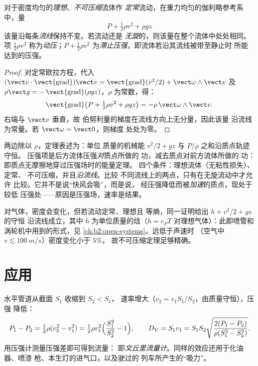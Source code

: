 \begin{theorem}[伯努利]\label{thm:b2:euler-bernoulli:bernoulli}
对于密度均匀的\emph{理想}、\emph{不可压缩}流体作
\emph{定常}流动，在重力均匀的伽利略参考系中，量
\[
P + \tfrac12\rho v^2 + \rho gz
\]
该量沿每条\emph{流线}保持不变。若流动还是
\emph{无旋}的，则该量在整个流体中处处相同。
项 $\tfrac12\rho v^2$ 称为\emph{动压}；$P + \tfrac12\rho v^2$
为\emph{滞止压强}，即流体若沿其流线被带至静止时
所能达到的压强。
\end{theorem}

\begin{proof}
对定常欧拉方程，代入 $(\vect v\cdot\operatorname{\vect{grad}})\vect v =
\operatorname{\vect{grad}}(v^2/2) + \vect\omega\wedge\vect v$ 及 $\rho\vect g =
-\operatorname{\vect{grad}}(\rho gz)$，$\rho$ 为常数，得：
\[
\operatorname{\vect{grad}}\bigl(P + \tfrac12\rho v^2 + \rho gz\bigr) = -\rho\,
\vect\omega\wedge\vect v .
\]
右端与 $\vect v$ 垂直，故
伯努利量的梯度在流线方向上无分量，因此该量
沿流线为常量。若 $\vect\omega = \vect 0$，则梯度
处处为零。
\end{proof}

\begin{remark}\label{rem:b2:euler-bernoulli:meaning}
两边除以 $\rho$，定理表述为：单位
质量的机械能 $v^2/2 + gz$ 与 $P/\rho$ 之和沿质点轨迹守恒。
压强项是后方流体压强\emph{对}质点所做的
功，减去质点对前方流体所做的
功：即质点无摩擦地穿过压强场时的能量定理。
四个条件：理想流体（无粘性损失）、定常、
不可压缩，并且\emph{沿流线}。比较
不同流线上的两点，只有在无旋流动中才允许
比较。它并不是说“快风会吸”，而是说，
经压强降低而被\emph{加速}的质点，现处于较低
压强处——原因是压强场，速率是结果。
\end{remark}

\begin{remark}[可压缩流体]\label{rem:b2:euler-bernoulli:compressible}
对气体，密度会变化，但若流动定常、理想且
等熵，同一证明给出 $h + v^2/2 + gz$ 的守恒
沿流线成立，其中 $h$ 为单位质量的焓（$h = c_PT$
对理想气体）：此即喷管和涡轮机中用到的形式，见
\cref{ch:b2:open-systems}。远低于声速时
（空气中 $v \lesssim \qty{100}{m/s}$）密度变化小于 $5\%$，
故不可压缩定理足够精确。
\end{remark}

\section{应用}

\begin{proposition}[文丘里流量计]\label{prop:b2:euler-bernoulli:venturi}
水平管道从截面 $S_1$ 收缩到 $S_2 < S_1$，
速率增大（$v_2 = v_1S_1/S_2$，由质量守恒），压强
降低：
\[
P_1 - P_2 = \tfrac12\rho(v_2^2 - v_1^2) = \tfrac12\rho v_1^2\Bigl(\frac{S_1^2}{S_2^2} - 1\Bigr) ,
\qquad
D_V = S_1v_1 = S_1S_2\sqrt{\frac{2(P_1 - P_2)}{\rho(S_1^2 - S_2^2)}} .
\]
用压强计测量压强差即可得到流量：
即\emph{文丘里流量计}。同样的效应还用于化油器、喷漆
枪、本生灯的进气口，以及驶过的
列车所产生的“吸力”。
\end{proposition}

